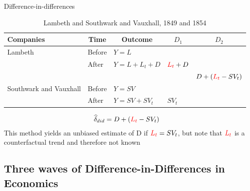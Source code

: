 \documentclass{beamer}
\begin{document}
\begin{frame}{Difference-in-differences}

\begin{table}\centering
\scriptsize
		\caption{Lambeth and Southwark and Vauxhall, 1849 and 1854}
		\begin{center}
		\begin{tabular}{lll|lc}
		\toprule
		\multicolumn{1}{l}{\textbf{Companies}}&
		\multicolumn{1}{c}{\textbf{Time}}&
		\multicolumn{1}{c}{\textbf{Outcome}}&
		\multicolumn{1}{c}{$D_1$}&
		\multicolumn{1}{c}{$D_2$}\\
		\midrule
		Lambeth & Before & $Y=L$ \\
		& After & $Y=L + L_t + D$ & $\textcolor{red}{L_t}+D$\\
		\midrule
		& & & & $D + (\textcolor{red}{L_t}- SV_t)$ \\
		\midrule
		Southwark and Vauxhall & Before & $Y=SV$ \\
		& After & $Y=SV + SV_t$ & $SV_t$\\
		\bottomrule
		\end{tabular}
		\end{center}
	\end{table}

\begin{eqnarray*}
\widehat{\delta}_{did} = D + (\textcolor{red}{L_t}- SV_t)
\end{eqnarray*}This method yields an unbiased estimate of D if $\textcolor{red}{L_t} = SV_t$, but note that $\textcolor{red}{L_t}$ is a counterfactual trend and therefore not known

\end{frame}






\subsection{Three waves of Difference-in-Differences in Economics}
\end{document}
